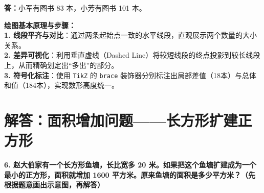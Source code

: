 \vspace{0.2cm}
\noindent\textbf{答：}小军有图书 83 本，小芳有图书 101 本。

\vspace{0.6cm}

{\small\color{blue!70!black}
\textbf{绘图基本原理与步骤：}\\
\textbf{1. 线段平齐与对比}：通过两条起始点一致的水平线段，直观展示两个数量的大小关系。\\
\textbf{2. 差异可视化}：利用垂直虚线（Dashed Line）将较短线段的终点投影到较长线段上，从而精确划定出“多出”的部分。\\
\textbf{3. 符号化标注}：使用 \texttt{TikZ} 的 \texttt{brace} 装饰器分别标注出局部差值（18本）与总体和值（184本），实现数形高度统一。
}

\newpage



\newpage

\section{解答：面积增加问题——长方形扩建正方形}

\vspace{0.4cm}

\noindent\textbf{6. 赵大伯家有一个长方形鱼塘，长比宽多 20 米。如果把这个鱼塘扩建成为一个最小的正方形，面积就增加 1600 平方米。原来鱼塘的面积是多少平方米？（先根据题意画出示意图，再解答）}

\vspace{0.8cm}

\begin{center}
\end{center}

